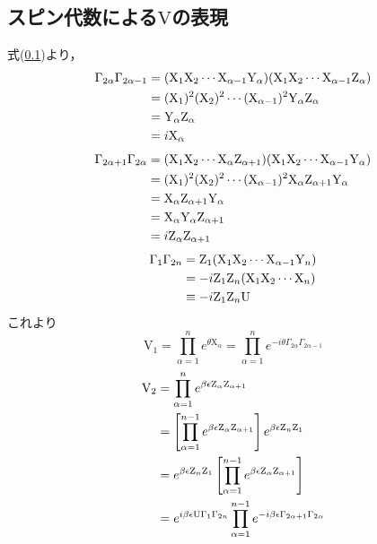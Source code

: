 \documentclass[a4paper,11pt]{jsreport}
\begin{document}
\subsection{スピン代数による$\mathrm{V}$の表現}
式(\ref{})より，
\begin{align}
  \Gamma_{2\alpha}\Gamma_{2\alpha-1} 
  &= (\mathrm{X}_1 \mathrm{X}_2 \cdots \mathrm{X}_{\alpha-1} \mathrm{Y}_{\alpha}) (\mathrm{X}_1 \mathrm{X}_2 \cdots \mathrm{X}_{\alpha-1} \mathrm{Z}_{\alpha}) \notag \\
  &= (\mathrm{X}_1)^2 (\mathrm{X}_2)^2 \cdots (\mathrm{X}_{\alpha-1})^2 \mathrm{Y}_{\alpha} \mathrm{Z}_{\alpha} \notag \\
  &= \mathrm{Y}_{\alpha} \mathrm{Z}_{\alpha} \notag \\
  &= i \mathrm{X}_{\alpha}
\end{align}
\begin{align}
  \Gamma_{2\alpha+1}\Gamma_{2\alpha} 
  &= (\mathrm{X}_1 \mathrm{X}_2 \cdots \mathrm{X}_{\alpha} \mathrm{Z}_{\alpha+1}) (\mathrm{X}_1 \mathrm{X}_2 \cdots \mathrm{X}_{\alpha-1} \mathrm{Y}_{\alpha}) \notag \\
  &= (\mathrm{X}_1)^2 (\mathrm{X}_2)^2 \cdots (\mathrm{X}_{\alpha-1})^2 \mathrm{X}_{\alpha} \mathrm{Z}_{\alpha+1} \mathrm{Y}_{\alpha} \notag \\
  &= \mathrm{X}_{\alpha} \mathrm{Z}_{\alpha+1} \mathrm{Y}_{\alpha} \notag \\
  &= \mathrm{X}_{\alpha} \mathrm{Y}_{\alpha} \mathrm{Z}_{\alpha+1} \notag \\
  &= i \mathrm{Z}_{\alpha} \mathrm{Z}_{\alpha+1}
\end{align}
\begin{align}
  \Gamma_1\Gamma_{2n} 
  &= \mathrm{Z}_1 (\mathrm{X}_1 \mathrm{X}_2 \cdots \mathrm{X}_{\alpha-1} \mathrm{Y}_n) \notag \\
  &= -i \mathrm{Z}_1 \mathrm{Z}_n (\mathrm{X}_1 \mathrm{X}_2 \cdots \mathrm{X}_n) \notag \\
  &\equiv -i \mathrm{Z}_1 \mathrm{Z}_n \mathrm{U}
\end{align}
これより
\begin{equation}
  \mathrm{V_1}
  = \prod_{\alpha=1}^{n} e^{\theta \mathrm{X}_{\alpha}}
  = \prod_{\alpha=1}^{n} e^{-i \theta \Gamma_{2\alpha} \Gamma_{2\alpha-1}}
\end{equation}
\begin{align}
  \mathrm{V}_2
  &= \prod_{\alpha=1}^{n} e^{\beta \epsilon \mathrm{Z}_{\alpha} \mathrm{Z}_{\alpha+1}} \notag \\
  &= \left[ \prod_{\alpha=1}^{n-1} e^{\beta \epsilon \mathrm{Z}_{\alpha} \mathrm{Z}_{\alpha+1}} \right] e^{\beta \epsilon \mathrm{Z}_n \mathrm{Z}_1} \notag \\
  &= e^{\beta \epsilon \mathrm{Z}_n \mathrm{Z}_1} \left[ \prod_{\alpha=1}^{n-1} e^{\beta \epsilon \mathrm{Z}_{\alpha} \mathrm{Z}_{\alpha+1}} \right] \notag \\
  &= e^{i \beta \epsilon \mathrm{U} \Gamma_1 \Gamma_{2n}} \prod_{\alpha=1}^{n-1} e^{-i \beta \epsilon \Gamma_{2\alpha+1} \Gamma_{2\alpha}} 
\end{align}
\end{document}
